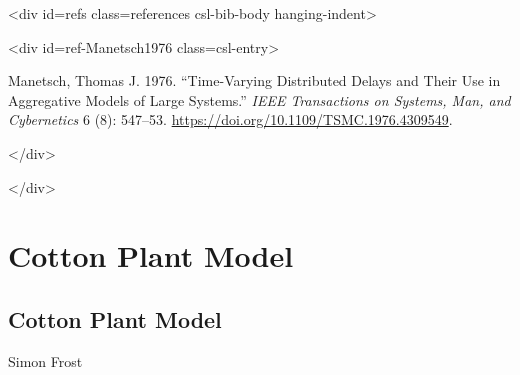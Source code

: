 <div id={\textquotedbl}refs{\textquotedbl} class={\textquotedbl}references csl-bib-body hanging-indent{\textquotedbl}>



<div id={\textquotedbl}ref-Manetsch1976{\textquotedbl} class={\textquotedbl}csl-entry{\textquotedbl}>



Manetsch, Thomas J. 1976. “Time-Varying Distributed Delays and Their Use in Aggregative Models of Large Systems.” \emph{IEEE Transactions on Systems, Man, and Cybernetics} 6 (8): 547–53. \href{https://doi.org/10.1109/TSMC.1976.4309549}{https://doi.org/10.1109/TSMC.1976.4309549}.



</div>



</div>



\chapter{Cotton Plant Model}


\section{Cotton Plant Model}



\label{16325219558907732839}{}


Simon Frost



